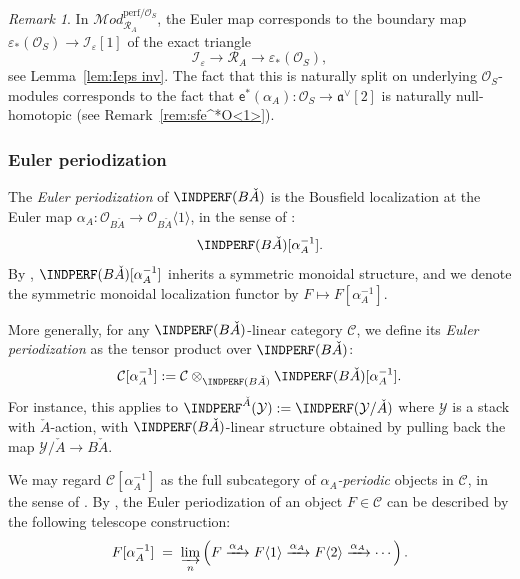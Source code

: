 \documentclass[12pt, oneside]{amsart}
\numberwithin{equation}{section}
\theoremstyle{remark}
\newtheorem{remark}[subsubsection]{Remark}
\theoremstyle{plain}
\newcommand{\MOD}{\mathcal{M}\textit{od}}
\newcommand{\R}{\mathcal{R}}
\newcommand{\RA}{\R_A}
\newcommand{\frav}{\mathfrak{a}^\vee}
\newcommand{\OO}{\mathcal{O}}
\newcommand{\YY}{\mathcal{Y}}
\newcommand{\Thom}[1]{\langle #1 \rangle}
\newcommand{\eps}{\varepsilon}
\newcommand{\sfe}{\mathsf{e}}
\begin{document}
\begin{remark}\label{rem:sfe^*beta}
  In $\MOD_{\RA}^{\mathrm{perf}/\OO_S}$, the Euler map corresponds to the boundary map $\eps_*(\OO_S) \to \mathcal{I}_{\eps}[1]$ of the exact triangle
  \[
    \mathcal{I}_{\eps} \to \RA \to \eps_*(\OO_S),
  \]
  see Lemma~\ref{lem:Ieps inv}.
  The fact that this is naturally split on underlying $\OO_S$-modules corresponds to the fact that $\sfe^*(\alpha_A) : \OO_S \to \frav[2]$ is naturally null-homotopic (see Remark~\ref{rem:sfe^*O<1>}).
\end{remark}

\subsubsection{Euler periodization}\label{sssec:Euler periodization}

The \emph{Euler periodization} of $\INDPERF(B\check{A})$ is the Bousfield localization at the Euler map $\alpha_{A} : \OO_{B\check{A}} \to \OO_{B\check{A}}\Thom{1}$, in the sense of \cite[\S 5.5.4]{LurieHTT}:
\[
  \INDPERF(B\check{A})[\alpha_A^{-1}].
\]
By \cite[Prop.~4.8.2.7]{LurieHA}, $\INDPERF(B\check{A})[\alpha_A^{-1}]$ inherits a symmetric monoidal structure, and we denote the symmetric monoidal localization functor by $F \mapsto F[\alpha_A^{-1}]$.

More generally, for any $\INDPERF(B\check{A})$-linear category $\mathcal{C}$, we define its \emph{Euler periodization} as the tensor product over $\INDPERF(B\check{A})$:
\[
  \mathcal{C}[\alpha_A^{-1}] := \mathcal{C} \otimes_{\INDPERF(B\check{A})} \INDPERF(B\check{A})[\alpha_A^{-1}].
\]
For instance, this applies to $\INDPERF^{\check{A}}(\YY) := \INDPERF(\YY/\check{A})$ where $\YY$ is a stack with $\check{A}$-action, with $\INDPERF(B\check{A})$-linear structure obtained by pulling back the map $\YY/\check{A}\to B\check{A}$.

We may regard $\mathcal{C}[\alpha_A^{-1}]$ as the full subcategory of \emph{$\alpha_A$-periodic} objects in $\mathcal{C}$, in the sense of \cite[\S 3]{HoyoisCdh}.
By \cite[Lem.~3.3]{HoyoisCdh}, the Euler periodization of an object $F \in \mathcal{C}$ can be described by the following telescope construction:
\[
  F[\alpha_A^{-1}]
  \;=\; \varinjlim_n \left( F \xrightarrow{\alpha_A} F\Thom{1} \xrightarrow{\alpha_A} F\Thom{2} \xrightarrow{\alpha_A} \cdots \right).
\]

\subsubsection{}
\end{document}
